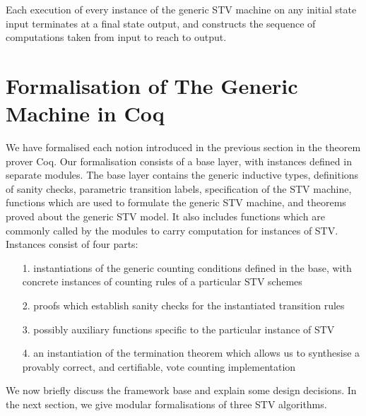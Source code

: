 \documentclass{llncs}
\begin{document}
\begin{theorem}[Termination]\label{termination}
Each execution of every instance of the generic STV machine on any
initial state
\textsf{input} terminates at a final state \textsf{output},
and constructs the sequence of computations taken from
\textsf{input} to reach to \textsf{output}.  
\end{theorem}   


\section{Formalisation of The Generic Machine in Coq}
We have formalised each notion introduced in the previous section in
the theorem prover Coq. Our formalisation consists of a base layer,
with instances defined in separate modules.
The base layer contains the generic
inductive types, definitions of sanity checks, parametric transition
labels, specification of the STV machine, functions which are used
to formulate the generic STV machine, and theorems proved about the
generic STV model. It also includes functions which are commonly
called by the modules to carry computation for instances of STV.
Instances consist of four parts:

\begin{itemize}
\item[1.] instantiations of the generic counting conditions defined in the base, with concrete instances of counting rules of a particular STV schemes
\item[2.] proofs which establish sanity checks for the instantiated transition rules
\item[3.] possibly auxiliary functions specific to the particular
instance of STV
\item[4.] an instantiation of the termination theorem which allows
us to synthesise a provably correct, and certifiable, vote counting
implementation
\end{itemize}       
We now  briefly discuss the framework base and explain some design
decisions. In the next section, we give  modular formalisations of three STV algorithms.  
\end{document}
